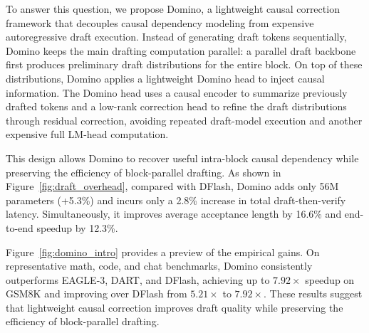 To answer this question, we propose Domino, a lightweight causal correction framework that decouples causal dependency modeling from expensive autoregressive draft execution. Instead of generating draft tokens sequentially, Domino keeps the main drafting computation parallel: a parallel draft backbone first produces preliminary draft distributions for the entire block. On top of these distributions, Domino applies a lightweight Domino head to inject causal information. The Domino head uses a causal encoder to summarize previously drafted tokens and a low-rank correction head to refine the draft distributions through residual correction, avoiding repeated draft-model execution and another expensive full LM-head computation.

This design allows Domino to recover useful intra-block causal dependency while preserving the efficiency of block-parallel drafting. As shown in Figure~\ref{fig:draft_overhead}, compared with DFlash, Domino adds only 56M parameters (+5.3\%) and incurs only a 2.8\% increase in total draft-then-verify latency. Simultaneously, it improves average acceptance length by 16.6\% and end-to-end speedup by 12.3\%. 

Figure~\ref{fig:domino_intro} provides a preview of the empirical gains. 
On representative math, code, and chat benchmarks, Domino consistently outperforms EAGLE-3, DART, and DFlash, achieving up to \(7.92\times\) speedup on GSM8K and improving over DFlash from \(5.21\times\) to \(7.92\times\). 
These results suggest that lightweight causal correction improves draft quality while preserving the efficiency of block-parallel drafting.




